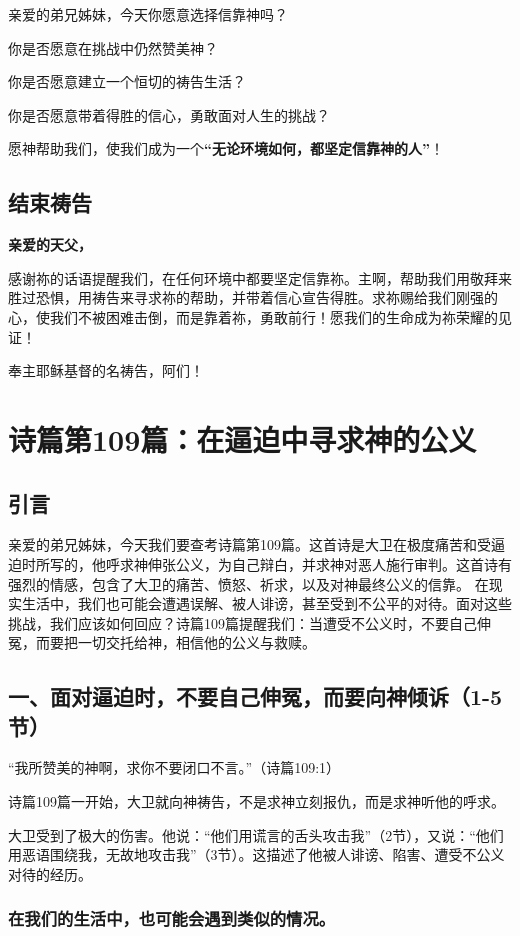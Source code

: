 \documentclass[a4paper, 12pt]{article}
\begin{document}
亲爱的弟兄姊妹，今天你愿意选择信靠神吗？

你是否愿意在挑战中仍然赞美神？

你是否愿意建立一个恒切的祷告生活？

你是否愿意带着得胜的信心，勇敢面对人生的挑战？

愿神帮助我们，使我们成为一个\textbf{“无论环境如何，都坚定信靠神的人”}！

\subsection*{结束祷告}
\textbf{亲爱的天父，}

感谢祢的话语提醒我们，在任何环境中都要坚定信靠祢。主啊，帮助我们用敬拜来胜过恐惧，用祷告来寻求祢的帮助，并带着信心宣告得胜。求祢赐给我们刚强的心，使我们不被困难击倒，而是靠着祢，勇敢前行！愿我们的生命成为祢荣耀的见证！

奉主耶稣基督的名祷告，阿们！
\newpage
\section{诗篇第109篇：在逼迫中寻求神的公义}
\subsection*{引言}
亲爱的弟兄姊妹，今天我们要查考诗篇第109篇。这首诗是大卫在极度痛苦和受逼迫时所写的，他呼求神伸张公义，为自己辩白，并求神对恶人施行审判。这首诗有强烈的情感，包含了大卫的痛苦、愤怒、祈求，以及对神最终公义的信靠。
在现实生活中，我们也可能会遭遇误解、被人诽谤，甚至受到不公平的对待。面对这些挑战，我们应该如何回应？诗篇109篇提醒我们：当遭受不公义时，不要自己伸冤，而要把一切交托给神，相信他的公义与救赎。

\subsection*{一、面对逼迫时，不要自己伸冤，而要向神倾诉（1-5节）}
“我所赞美的神啊，求你不要闭口不言。”（诗篇109:1）

诗篇109篇一开始，大卫就向神祷告，不是求神立刻报仇，而是求神听他的呼求。

大卫受到了极大的伤害。他说：“他们用谎言的舌头攻击我”（2节），又说：“他们用恶语围绕我，无故地攻击我”（3节）。这描述了他被人诽谤、陷害、遭受不公义对待的经历。

\subsubsection*{在我们的生活中，也可能会遇到类似的情况。}
\end{document}
